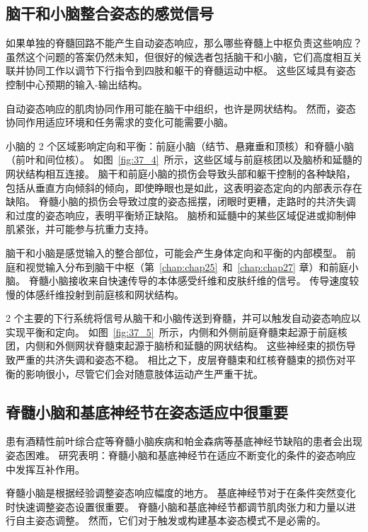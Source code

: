 \subsection{脑干和小脑整合姿态的感觉信号}

如果单独的脊髓回路不能产生自动姿态响应，那么哪些脊髓上中枢负责这些响应？
虽然这个问题的答案仍然未知，但很好的候选者包括脑干和小脑，它们高度相互关联并协同工作以调节下行指令到四肢和躯干的脊髓运动中枢。
这些区域具有姿态控制中心预期的输入-输出结构。


自动姿态响应的肌肉协同作用可能在脑干中组织，也许是网状结构。
然而，姿态协同作用适应环境和任务需求的变化可能需要小脑。


小脑的 2 个区域影响定向和平衡：前庭小脑（结节、悬雍垂和顶核）和脊髓小脑（前叶和间位核）。
如图~\ref{fig:37_4}~所示，这些区域与前庭核团以及脑桥和延髓的网状结构相互连接。
脑干和前庭小脑的损伤会导致头部和躯干控制的各种缺陷，包括从垂直方向倾斜的倾向，即使睁眼也是如此，这表明姿态定向的内部表示存在缺陷。
脊髓小脑的损伤会导致过度的姿态摇摆，闭眼时更糟，走路时的共济失调和过度的姿态响应，表明平衡矫正缺陷。
脑桥和延髓中的某些区域促进或抑制伸肌紧张，并可能参与抗重力支持。


脑干和小脑是感觉输入的整合部位，可能会产生身体定向和平衡的内部模型。
前庭和视觉输入分布到脑干中枢（第~\ref{chap:chap25}~和~\ref{chap:chap27} 章）和前庭小脑。
脊髓小脑接收来自快速传导的本体感受纤维和皮肤纤维的信号。
传导速度较慢的体感纤维投射到前庭核和网状结构。


2 个主要的下行系统将信号从脑干和小脑传送到脊髓，并可以触发自动姿态响应以实现平衡和定向。
如图~\ref{fig:37_5}~所示，内侧和外侧前庭脊髓束起源于前庭核团，内侧和外侧网状脊髓束起源于脑桥和延髓的网状结构。
这些神经束的损伤导致严重的共济失调和姿态不稳。
相比之下，皮层脊髓束和红核脊髓束的损伤对平衡的影响很小，尽管它们会对随意肢体运动产生严重干扰。



\subsection{脊髓小脑和基底神经节在姿态适应中很重要}

患有酒精性前叶综合症等脊髓小脑疾病和帕金森病等基底神经节缺陷的患者会出现姿态困难。
研究表明：脊髓小脑和基底神经节在适应不断变化的条件的姿态响应中发挥互补作用。


脊髓小脑是根据经验调整姿态响应幅度的地方。
基底神经节对于在条件突然变化时快速调整姿态设置很重要。
脊髓小脑和基底神经节都调节肌肉张力和力量以进行自主姿态调整。
然而，它们对于触发或构建基本姿态模式不是必需的。


